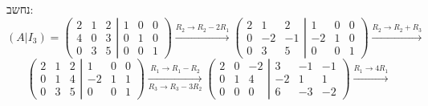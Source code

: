 \documentclass{article}
\begin{document}
נחשב:
\[
    (A | I_3) =
    \left(
    \begin{matrix}
            2 & 1 & 2 \\
            4 & 0 & 3 \\
            0 & 3 & 5
        \end{matrix}
    \left|
    \begin{matrix}
            1 & 0 & 0 \\
            0 & 1 & 0 \\
            0 & 0 & 1
        \end{matrix}
    \right.
    \right)
    \xrightarrow{R_2\rightarrow R_2-2R_1}
    \left(
    \begin{matrix}
            2 & 1  & 2  \\
            0 & -2 & -1 \\
            0 & 3  & 5
        \end{matrix}
    \left|
    \begin{matrix}
            1  & 0 & 0 \\
            -2 & 1 & 0 \\
            0  & 0 & 1
        \end{matrix}
    \right.
    \right)
    \xrightarrow{R_2\rightarrow R_2+R_3}
\]
\[
    \left(
    \begin{matrix}
            2 & 1 & 2 \\
            0 & 1 & 4 \\
            0 & 3 & 5
        \end{matrix}
    \left|
    \begin{matrix}
            1  & 0 & 0 \\
            -2 & 1 & 1 \\
            0  & 0 & 1
        \end{matrix}
    \right.
    \right)
    \xrightarrow[R_3\rightarrow R_3-3R_2]{R_1\rightarrow R_1-R_2}
    \left(
    \begin{matrix}
            2 & 0 & -2 \\
            0 & 1 & 4  \\
            0 & 0 & 0
        \end{matrix}
    \left|
    \begin{matrix}
            3  & -1 & -1 \\
            -2 & 1  & 1  \\
            6  & -3 & -2
        \end{matrix}
    \right.
    \right)
    \xrightarrow{R_1\rightarrow 4R_1}
\]
\end{document}
